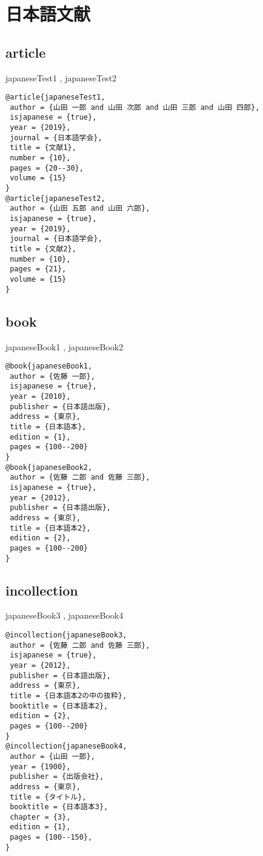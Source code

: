 \documentclass[10pt,a4paper]{article}
\author{JPandENbst}
\begin{document}
\section{日本語文献}
\subsection{article\\}
japaneseTest1 \cite{japaneseTest1}, 
japaneseTest2 \cite{japaneseTest2}

\begin{lstlisting}
@article{japaneseTest1,
 author = {山田 一郎 and 山田 次郎 and 山田 三郎 and 山田 四郎},
 isjapanese = {true},
 year = {2019},
 journal = {日本語学会},
 title = {文献1},
 number = {10},
 pages = {20--30},
 volume = {15}
}
@article{japaneseTest2,
 author = {山田 五郎 and 山田 六郎},
 isjapanese = {true},
 year = {2019},
 journal = {日本語学会},
 title = {文献2},
 number = {10},
 pages = {21},
 volume = {15}
}
\end{lstlisting}

\subsection{book\\}
japaneseBook1 \cite{japaneseBook1}, 
japaneseBook2 \cite{japaneseBook2}

\begin{lstlisting}
@book{japaneseBook1,
 author = {佐藤 一郎},
 isjapanese = {true},
 year = {2010},
 publisher = {日本語出版},
 address = {東京},
 title = {日本語本},
 edition = {1},
 pages = {100--200}
}
@book{japaneseBook2,
 author = {佐藤 二郎 and 佐藤 三郎},
 isjapanese = {true},
 year = {2012},
 publisher = {日本語出版},
 address = {東京},
 title = {日本語本2},
 edition = {2},
 pages = {100--200}
}
\end{lstlisting}

\subsection{incollection\\}
japaneseBook3 \cite{japaneseBook3}, 
japaneseBook4 \cite{japaneseBook4}

\begin{lstlisting}
@incollection{japaneseBook3,
 author = {佐藤 二郎 and 佐藤 三郎},
 isjapanese = {true},
 year = {2012},
 publisher = {日本語出版},
 address = {東京},
 title = {日本語本2の中の抜粋},
 booktitle = {日本語本2},
 edition = {2},
 pages = {100--200}
}
@incollection{japaneseBook4,
 author = {山田 一郎},
 year = {1900},
 publisher = {出版会社},
 address = {東京},
 title = {タイトル},
 booktitle = {日本語本3},
 chapter = {3},
 edition = {1},
 pages = {100--150},
}
\end{lstlisting}
\end{document}
